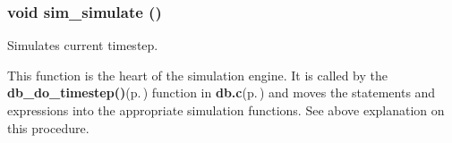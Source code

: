 \subsubsection{\setlength{\rightskip}{0pt plus 5cm}void sim\_\-simulate ()}\label{sim_8h_a6}


Simulates current timestep. 

This function is the heart of the simulation engine. It is called by the {\bf db\_\-do\_\-timestep()}{\rm (p.\,\pageref{db_8c_a45})} function in {\bf db.c}{\rm (p.\,\pageref{db_8c})} and moves the statements and expressions into the appropriate simulation functions. See above explanation on this procedure. 